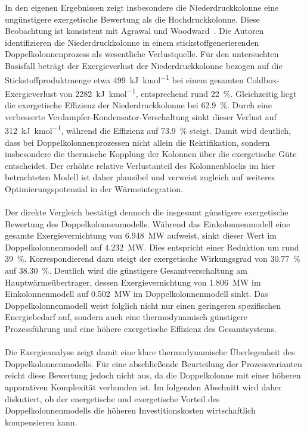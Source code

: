 In den eigenen Ergebnissen zeigt insbesondere die Niederdruckkolonne eine ungünstigere exergetische Bewertung als die Hochdruckkolonne. Diese Beobachtung ist konsistent mit Agrawal und Woodward~\cite{agrawalEfficientCryogenicNitrogen1991}. Die Autoren identifizieren die Niederdruckkolonne in einem stickstoffgenerierenden Doppelkolonnenprozess als wesentliche Verlustquelle. Für den untersuchten Basisfall beträgt der Exergieverlust der Niederdruckkolonne bezogen auf die Stickstoffproduktmenge etwa \SI{499}{\kilo\joule\per\kilo\mole} bei einem gesamten Coldbox-Exergieverlust von \SI{2282}{\kilo\joule\per\kilo\mole}, entsprechend rund \SI{22}{\percent}. Gleichzeitig liegt die exergetische Effizienz der Niederdruckkolonne bei \SI{62.9}{\percent}. Durch eine verbesserte Verdampfer-Kondensator-Verschaltung sinkt dieser Verlust auf \SI{312}{\kilo\joule\per\kilo\mole}, während die Effizienz auf \SI{73.9}{\percent} steigt. Damit wird deutlich, dass bei Doppelkolonnenprozessen nicht allein die Rektifikation, sondern insbesondere die thermische Kopplung der Kolonnen über die exergetische Güte entscheidet. Der erhöhte relative Verlustanteil des Kolonnenblocks im hier betrachteten Modell ist daher plausibel und verweist zugleich auf weiteres Optimierungspotenzial in der Wärmeintegration.\\
\\
Der direkte Vergleich bestätigt dennoch die insgesamt günstigere exergetische Bewertung des Doppelkolonnenmodells. Während das Einkolonnenmodell eine gesamte Exergievernichtung von \SI{6.948}{MW} aufweist, sinkt dieser Wert im Doppelkolonnenmodell auf \SI{4.232}{MW}. Dies entspricht einer Reduktion um rund \SI{39}{\percent}. Korrespondierend dazu steigt der exergetische Wirkungsgrad von \SI{30.77}{\percent} auf \SI{38.30}{\percent}. Deutlich wird die günstigere Gesamtverschaltung am Hauptwärmeübertrager, dessen Exergievernichtung von \SI{1.806}{MW} im Einkolonnenmodell auf \SI{0.502}{MW} im Doppelkolonnenmodell sinkt. Das Doppelkolonnenmodell weist folglich nicht nur einen geringeren spezifischen Energiebedarf auf, sondern auch eine thermodynamisch günstigere Prozessführung und eine höhere exergetische Effizienz des Gesamtsystems.\\
\\
Die Exergieanalyse zeigt damit eine klare thermodynamische Überlegenheit des Doppelkolonnenmodells. Für eine abschließende Beurteilung der Prozessvarianten reicht diese Bewertung jedoch nicht aus, da die Doppelkolonne mit einer höheren apparativen Komplexität verbunden ist. Im folgenden Abschnitt wird daher diskutiert, ob der energetische und exergetische Vorteil des Doppelkolonnenmodells die höheren Investitionskosten wirtschaftlich kompensieren kann.\\
